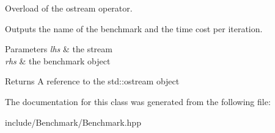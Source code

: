 Overload of the ostream operator. 

Outputs the name of the benchmark and the time cost per iteration.


\begin{DoxyParams}{Parameters}
{\em lhs} & the stream \\
\hline
{\em rhs} & the benchmark object \\
\hline
\end{DoxyParams}
\begin{DoxyReturn}{Returns}
A reference to the std\-::ostream object 
\end{DoxyReturn}


The documentation for this class was generated from the following file\-:\begin{DoxyCompactItemize}
\item 
include/\-Benchmark/Benchmark.\-hpp\end{DoxyCompactItemize}
